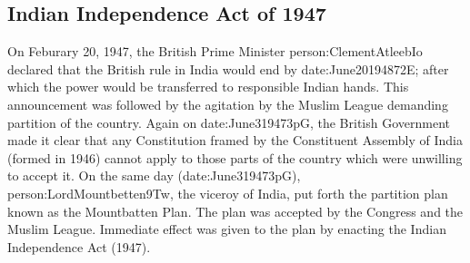 \subsection{Indian Independence Act of 1947}

On Feburary 20, 1947, the British Prime Minister \gls{person:ClementAtleebIo} declared that the British rule in India would end by \gls{date:June20194872E}; after which the power would be transferred to responsible Indian hands. This announcement was followed by the agitation by the Muslim League demanding partition of the country. Again on \gls{date:June319473pG}, the British Government made it clear that any Constitution framed by the Constituent Assembly of India (formed in 1946) cannot apply to those parts of the country which were unwilling to accept it. On the same day (\gls{date:June319473pG}), \gls{person:LordMountbetten9Tw}, the viceroy of India, put forth the partition plan known as the Mountbatten Plan. The plan was accepted by the Congress and the Muslim League. Immediate effect was given to the plan by enacting the Indian Independence Act (1947).

